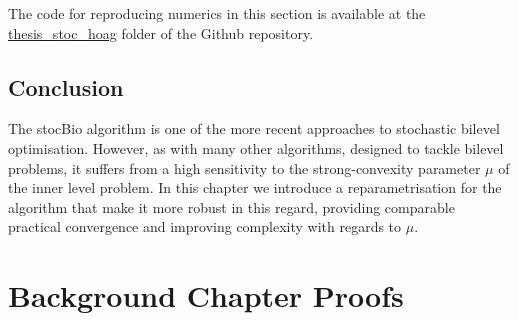 \documentclass[11pt, twoside]{report}
\begin{document}
The code for reproducing numerics in this section is available at the \href{https://github.com/icheltso/thesis/tree/main/thesis\_stoc\_hoag}{thesis\_stoc\_hoag} folder of the Github repository.

\section{Conclusion}
The stocBio algorithm is one of the more recent approaches to stochastic bilevel optimisation. However, as with many other algorithms, designed to tackle bilevel problems, it suffers from a high sensitivity to the strong-convexity parameter $\mu$ of the inner level problem. In this chapter we introduce a reparametrisation for the algorithm that make it more robust in this regard, providing comparable practical convergence and improving complexity with regards to $\mu$.





\appendix
\chapter{Background Chapter Proofs}
\end{document}
